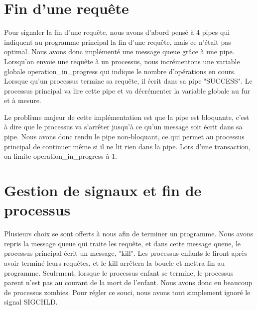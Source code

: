 \documentclass[utf8]{article}
\begin{document}
\section{Fin d'une requête}

\indent{}
\par

Pour signaler la fin d'une requête, nous avons d'abord pensé à 4 pipes qui indiquent au programme principal 
la fin d'une requête, mais ce n'était pas optimal. Nous avons donc implémenté une message queue grâce à une pipe. Lorsqu'on envoie 
une requête à un processus, nous incrémentons une variable globale operation\_in\_progress qui indique le nombre d'opérations en cours.
Lorsque qu'un processus termine sa requête, il écrit dans sa pipe "SUCCESS". Le processus principal va lire cette pipe et va décrémenter
la variable globale au fur et à mesure. 
\par
\indent{}
\par
Le problème majeur de cette implémentation est que la pipe est bloquante, c'est à dire que le processus
va s'arrêter jusqu'à ce qu'un message soit écrit dans sa pipe. Nous avons donc rendu le pipe non-bloquant, ce qui permet au processus principal de continuer
même si il ne lit rien dans la pipe. Lors d'une transaction, on limite operation\_in\_progress à 1.
\par

\section{Gestion de signaux et fin de processus}
\indent{}
\par
Plusieurs choix se sont offerts à nous afin de terminer un programme.
Nous avons repris la message queue qui traite les requête, et dans 
cette message queue, le processus principal écrit un message, "kill". Les processus enfants le liront après avoir terminé leurs requêtes,
et le kill arrêtera la boucle et mettra fin au programme.
Seulement, lorsque le processus enfant se termine, le processus parent n'est pas au courant de la mort de l'enfant. Nous avons donc eu 
beaucoup de processus zombies. Pour régler ce souci, nous avons tout simplement ignoré le signal SIGCHLD.
\par
\end{document}
